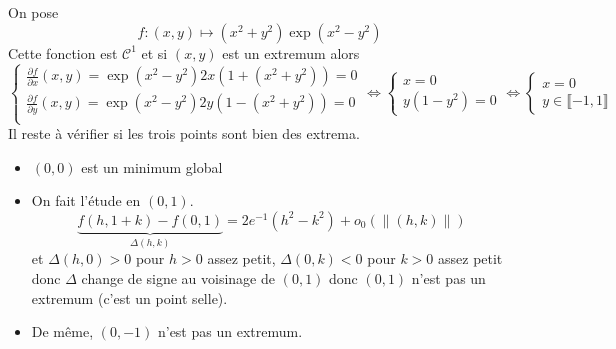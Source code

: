 \begin{ex}
    On pose \[
        f:(x, y)\longmapsto (x^2+y^2)\exp(x^2-y^2)
    \]
    Cette fonction est $\mathcal C^1$ et si $(x, y)$ est un extremum alors \[
        \begin{cases}
            \displaystyle \frac{\partial f}{\partial x}(x, y)=\exp(x^2-y^2)2x(1+(x^2+y^2)) =0 \\[1em]
            \displaystyle \frac{\partial f}{\partial y}(x, y)=\exp(x^2-y^2)2y(1-(x^2+y^2)) =0 \\
            \end{cases} \iff \begin{cases}
            x=0 \\ y(1-y^2)=0
            \end{cases} \iff \begin{cases}
            x=0\\
            y\in \llbracket -1, 1\rrbracket
        \end{cases}
    \]
    Il reste à vérifier si les trois points sont bien des extrema. \begin{itemize}
        \item $(0, 0)$ est un minimum global
        \item On fait l'étude en $(0, 1)$. \[
                \underbrace{f(h, 1+k)-f(0, 1)}_{\Delta(h, k)}=2e^{-1}(h^2-k^2)+o_0(\|(h, k)\|)
            \]
            et $\Delta(h, 0)>0$ pour $h>0$ assez petit, $\Delta(0, k)<0$ pour $k>0$ assez petit donc $\Delta$ change de signe au voisinage de $(0, 1)$ donc $(0, 1)$ n'est pas un extremum (c'est un point selle).
        \item De même, $(0, -1)$ n'est pas un extremum.
    \end{itemize}

    \begin{center}
    \end{center}

\end{ex}

